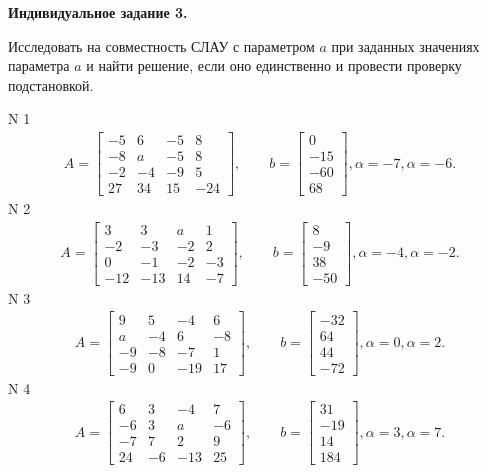 \documentclass[11pt]{report}
\begin{document}
\pagestyle{empty}

{\bf Индивидуальное задание 3.}


Исследовать на совместность СЛАУ с параметром $a$ при заданных значениях 
параметра $a$ и найти решение, если оно единственно 
и провести проверку подстановкой.


N 1
\begin{align*}
 A = \left[\begin{matrix}-5 & 6 & -5 & 8\\-8 & a & -5 & 8\\-2 & -4 & -9 & 5\\27 & 34 & 15 & -24\end{matrix}\right],
    \qquad b = \left[\begin{matrix}0\\-15\\-60\\68\end{matrix}\right], \alpha = -7, \alpha = -6. 
 \end{align*}
N 2
\begin{align*}
 A = \left[\begin{matrix}3 & 3 & a & 1\\-2 & -3 & -2 & 2\\0 & -1 & -2 & -3\\-12 & -13 & 14 & -7\end{matrix}\right],
    \qquad b = \left[\begin{matrix}8\\-9\\38\\-50\end{matrix}\right], \alpha = -4, \alpha = -2. 
 \end{align*}
N 3
\begin{align*}
 A = \left[\begin{matrix}9 & 5 & -4 & 6\\a & -4 & 6 & -8\\-9 & -8 & -7 & 1\\-9 & 0 & -19 & 17\end{matrix}\right],
    \qquad b = \left[\begin{matrix}-32\\64\\44\\-72\end{matrix}\right], \alpha = 0, \alpha = 2. 
 \end{align*}
N 4
\begin{align*}
 A = \left[\begin{matrix}6 & 3 & -4 & 7\\-6 & 3 & a & -6\\-7 & 7 & 2 & 9\\24 & -6 & -13 & 25\end{matrix}\right],
    \qquad b = \left[\begin{matrix}31\\-19\\14\\184\end{matrix}\right], \alpha = 3, \alpha = 7. 
 \end{align*}
\end{document}
